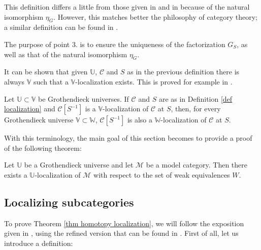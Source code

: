 \begin{rmk}
This definition differs a little from those given in \cite{gz} and in \cite{weibel} because of the natural isomorphism $\eta_G$. However, this matches better the philosophy of category theory; a similar definition can be found in \cite[Ch. 7.1]{kashiwara}.
\end{rmk}

\begin{rmk}
The purpose of point 3. is to ensure the uniqueness of the factorization $G_S$, as well as that of the natural isomorphism $\eta_G$.
\end{rmk}

\begin{rmk}
It can be shown that given $\mathbb U$, $\mathcal C$ and $S$ as in the previous definition there is always $\mathbb V$ such that a $\mathbb V$-localization exists. This is proved for example in \cite[I.1]{gz}.
\end{rmk}

\begin{rmk} \label{remark enlarging universe}
Let $\mathbb U \subset \mathbb V$ be Grothendieck universes. If $\mathcal C$ and $S$ are as in Definition \ref{def localization} and $\mathcal C[S^{-1}]$ is a $\mathbb V$-localization of $\mathcal C$ at $S$, then, for every Grothendieck universe $\mathbb V \subset \mathbb W$, $\mathcal C[S^{-1}]$ is also a $\mathbb W$-localization of $\mathcal C$ at $S$.
\end{rmk}

With this terminology, the main goal of this section becomes to provide a proof of the following theorem:

\begin{thm} \label{thm homotopy localization}
Let $\mathbb U$ be a Grothendieck universe and let $\mathcal M$ be a model category. Then there exists a $\mathbb U$-localization of $\mathcal M$ with respect to the set of weak equivalences $W$.
\end{thm}

\subsection{Localizing subcategories}

To prove Theorem \ref{thm homotopy localization}, we will follow the exposition given in \cite{dhk}, using the refined version that can be found in \cite{riehl}.  First of all, let us introduce a definition:

